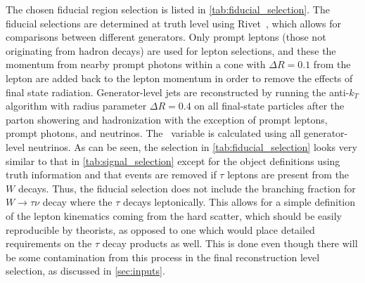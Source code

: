 The chosen fiducial region selection 
is listed in \tab\ref{tab:fiducial_selection}.
The fiducial selections are determined at truth level 
using Rivet~\cite{Buckley:2010ar}, which allows for 
comparisons between different generators.
Only prompt leptons (those not originating from hadron decays) are used for 
lepton selections, and these the momentum from nearby prompt photons 
within a cone with $\Delta R = 0.1$ from the lepton are added
back to the lepton momentum in order to remove the effects of final 
state radiation. Generator-level jets are 
reconstructed by running the anti-$k_T$ algorithm with radius 
parameter $\Delta R = 0.4$ on all final-state particles 
after the parton showering and hadronization with the exception of prompt 
leptons, prompt photons, and neutrinos. The \MET~variable is calculated 
using all generator-level neutrinos. 
As can be seen, the selection 
in \tab\ref{tab:fiducial_selection} looks very similar to that in 
\tab\ref{tab:signal_selection} except for the object definitions
using truth information and that 
events are removed if $\tau$ leptons are present from the $W$ decays.  
Thus, the fiducial selection
does not include the branching fraction for $W\rightarrow\tau\nu$ decay 
where the $\tau$ decays leptonically. This allows for a simple definition
of the lepton kinematics coming from the hard scatter, 
which should be easily reproducible by theorists,
as opposed to one which would place detailed requirements on the $\tau$ decay
products as well.
This is done even though there will be some contamination from this process in the final 
reconstruction level selection, as discussed in \sec\ref{sec:inputs}.



